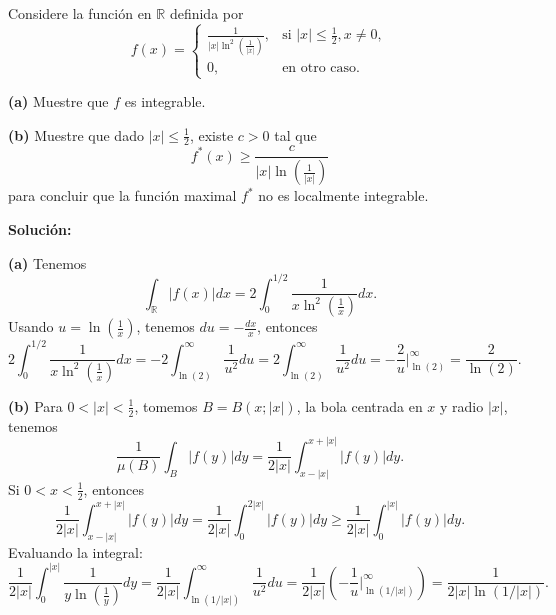 \documentclass{article}
\begin{document}
Considere la funci\'on en $\mathbb{R}$ definida por
\begin{equation*}
    f(x) =
    \begin{cases}
        \frac{1}{|x| \ln^2 \left(\frac{1}{|x|}\right)}, & \text{si } |x| \leq \frac{1}{2}, x \neq 0, \\
        0, & \text{en otro caso}.
    \end{cases}
\end{equation*}

\textbf{(a)} Muestre que $f$ es integrable.

\textbf{(b)} Muestre que dado $|x| \leq \frac{1}{2}$, existe $c > 0$ tal que
\begin{equation*}
    f^*(x) \geq \frac{c}{|x| \ln \left(\frac{1}{|x|}\right)}
\end{equation*}
para concluir que la funci\'on maximal $f^*$ no es localmente integrable.

\textbf{Soluci\'on:}

\textbf{(a)} Tenemos
\begin{equation*}
    \int_{\mathbb{R}} |f(x)| dx = 2 \int_{0}^{1/2} \frac{1}{x \ln^2 \left(\frac{1}{x}\right)} dx.
\end{equation*}
Usando $u = \ln \left(\frac{1}{x}\right)$, tenemos $du = -\frac{dx}{x}$, entonces
\begin{equation*}
    2 \int_{0}^{1/2} \frac{1}{x \ln^2 \left(\frac{1}{x}\right)} dx = -2 \int_{\ln(2)}^{\infty} \frac{1}{u^2} du = 2 \int_{\ln(2)}^{\infty} \frac{1}{u^2} du = -\frac{2}{u} \Big|_{\ln(2)}^{\infty} = \frac{2}{\ln(2)}.
\end{equation*}

\textbf{(b)} Para $0 < |x| < \frac{1}{2}$, tomemos $B = B(x; |x|)$, la bola centrada en $x$ y radio $|x|$, tenemos
\begin{equation*}
    \frac{1}{\mu(B)} \int_{B} |f(y)| dy = \frac{1}{2|x|} \int_{x - |x|}^{x + |x|} |f(y)| dy.
\end{equation*}
Si $0 < x < \frac{1}{2}$, entonces
\begin{equation*}
    \frac{1}{2|x|} \int_{x - |x|}^{x + |x|} |f(y)| dy = \frac{1}{2|x|} \int_{0}^{2|x|} |f(y)| dy \geq \frac{1}{2|x|} \int_{0}^{|x|} |f(y)| dy.
\end{equation*}
Evaluando la integral:
\begin{equation*}
    \frac{1}{2|x|} \int_{0}^{|x|} \frac{1}{y \ln \left(\frac{1}{y}\right)} dy = \frac{1}{2|x|} \int_{\ln(1/|x|)}^{\infty} \frac{1}{u^2} du = \frac{1}{2|x|} \left(-\frac{1}{u} \Big|_{\ln(1/|x|)}^{\infty}\right) = \frac{1}{2|x| \ln(1/|x|)}.
\end{equation*}
\end{document}
